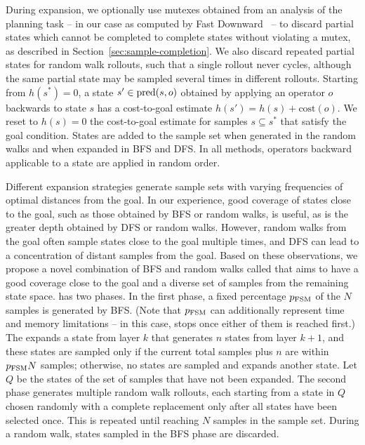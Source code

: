 During expansion, we optionally use mutexes obtained from an analysis of the planning task -- in our case as computed by Fast Downward~\cite{Helmert/2006} -- to discard partial states which cannot be completed to complete states without violating a mutex, as described in Section~\ref{sec:sample-completion}. We also discard repeated partial states for random walk rollouts, such that a single rollout never cycles, although the same partial state may be sampled several times in different rollouts. Starting from $h(s^*)=0$, a state $s'\in\operatorname{pred}(s,o)$ obtained by applying an operator $o$ backwards to state $s$ has a cost-to-goal estimate $h(s')=h(s)+\text{cost}(o)$. We reset to $h(s)=0$ the cost-to-goal estimate for samples $s\subseteq s^*$ that satisfy the goal condition. States are added to the sample set when generated in the random walks and when expanded in BFS and DFS. In all methods, operators backward applicable to a state are applied in random order.

Different expansion strategies generate sample sets with varying frequencies of  optimal distances from the goal. In our experience, good coverage of states close to the goal, such as those obtained by BFS or random walks, is useful, as is the greater depth obtained by DFS or random walks. However, random walks from the goal often sample states close to the goal multiple times, and DFS can lead to a concentration of distant samples from the goal. Based on these observations, we propose a novel combination of BFS and random walks called \bfsrw that aims to have a good coverage close to the goal and a diverse set of samples from the remaining state space. \bfsrw has two phases. In the first phase, a fixed percentage $p_\text{FSM}$ of the $N$ samples is generated by BFS. (Note that $p_\text{FSM}$ can additionally represent time and memory limitations -- in this case, \bfs stops once either of them is reached first.) The \bfs expands a state from layer $k$ that generates $n$ states from layer $k+1$, and these states are sampled only if the current total samples plus $n$ are within $p_{\text{FSM}}N$ samples; otherwise, no states are sampled and \bfs expands another state. Let $Q$ be the states of the set of samples that have not been expanded. The second phase generates multiple random walk rollouts, each starting from a state in $Q$ chosen randomly with a complete replacement only after all states have been selected once. This is repeated until reaching $N$ samples in the sample set. During a random walk, states sampled in the BFS phase are discarded.

